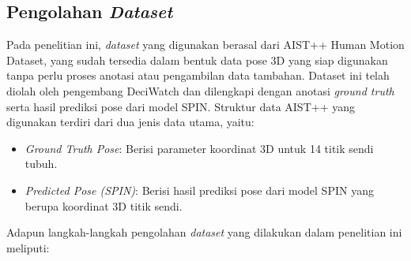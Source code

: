 \subsection{Pengolahan \textit{Dataset}}

Pada penelitian ini, \textit{dataset} yang digunakan berasal dari AIST++ Human Motion Dataset, yang sudah tersedia dalam bentuk data pose 3D yang siap digunakan tanpa perlu proses anotasi atau pengambilan data tambahan. Dataset ini telah diolah oleh pengembang DeciWatch dan dilengkapi dengan anotasi \textit{ground truth} serta hasil prediksi pose dari model SPIN. Struktur data AIST++ yang digunakan terdiri dari dua jenis data utama, yaitu:

\begin{itemize}
    \item \textit{Ground Truth Pose}: Berisi parameter koordinat 3D untuk 14 titik sendi tubuh.
    \item \textit{Predicted Pose (SPIN)}: Berisi hasil prediksi pose dari model SPIN yang berupa koordinat 3D titik sendi.
\end{itemize}

Adapun langkah-langkah pengolahan \textit{dataset} yang dilakukan dalam penelitian ini meliputi:

